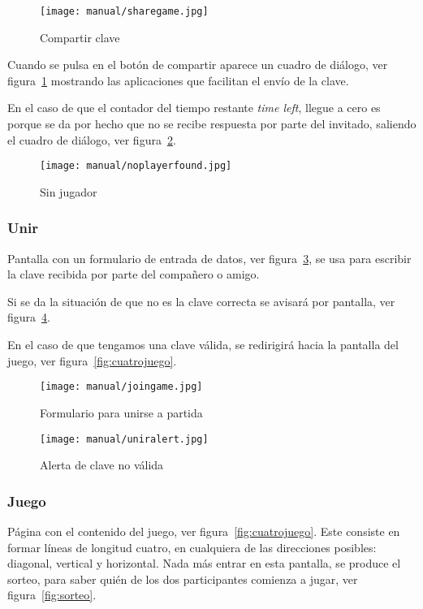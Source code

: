 \begin{figure}[H]
	\centering
	\texttt{[image: manual/sharegame.jpg]}
	\caption{Compartir clave}\label{fig:sharegame}
\end{figure}

Cuando se pulsa en el botón de compartir aparece un cuadro de diálogo, ver figura~\ref{fig:sharegame} mostrando las aplicaciones que facilitan el envío de la clave.

En el caso de que el contador del tiempo restante \emph{time left}, llegue a cero es porque se da por hecho que no se recibe respuesta por parte del invitado, saliendo el cuadro de diálogo, ver figura~\ref{fig:noplayerfound}.

\begin{figure}[H]
	\centering
	\texttt{[image: manual/noplayerfound.jpg]}
	\caption{Sin jugador}\label{fig:noplayerfound}
\end{figure}

\subsubsection{Unir}\label{cuatrounir}
Pantalla con un formulario de entrada de datos, ver figura~\ref{fig:cuatrounir}, se usa para escribir la clave recibida por parte del compañero o amigo. 

Si se da la situación de que no es la clave correcta se avisará por pantalla, ver figura~\ref{fig:uniralert}.

En el caso de que tengamos una clave válida, se redirigirá hacia la pantalla del juego, ver figura~\ref{fig:cuatrojuego}.

\begin{figure}[H]
	\centering
	\texttt{[image: manual/joingame.jpg]}
	\caption{Formulario para unirse a partida}\label{fig:cuatrounir}
\end{figure}

\begin{figure}[H]
	\centering
	\texttt{[image: manual/uniralert.jpg]}
	\caption{Alerta de clave no válida}\label{fig:uniralert}
\end{figure}

\subsubsection{Juego}\label{cuatrojuego}
Página con el contenido del juego, ver figura~\ref{fig:cuatrojuego}. Este consiste en formar líneas de longitud cuatro, en cualquiera de las direcciones posibles: diagonal, vertical y horizontal. Nada más entrar en esta pantalla, se produce el sorteo, para saber quién de los dos participantes comienza a jugar, ver figura~\ref{fig:sorteo}.

